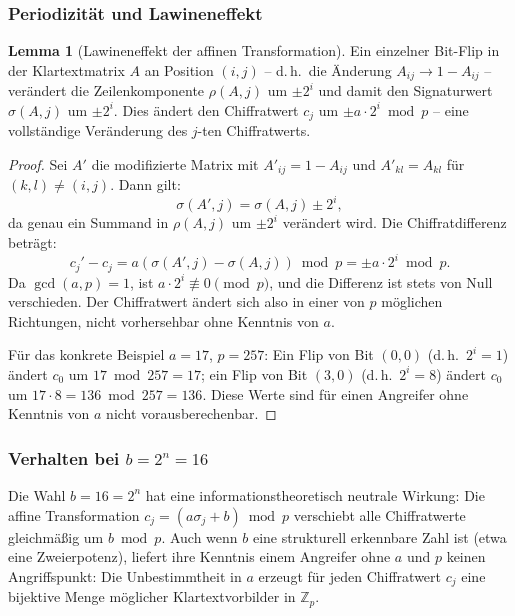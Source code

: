 ﻿\documentclass[a4paper,12pt]{scrreprt}
\theoremstyle{definition}
\newtheorem{lemma}{Lemma}[section]
\begin{document}
\subsubsection{Periodizität und Lawineneffekt}

\begin{lemma}[Lawineneffekt der affinen Transformation]
\label{lem:lawine}
Ein einzelner Bit-Flip in der Klartextmatrix $A$ an Position $(i, j)$ -- d.\,h.\ die Änderung $A_{ij} \to 1 - A_{ij}$ -- verändert die Zeilenkomponente $\rho(A,j)$ um $\pm 2^i$ und damit den Signaturwert $\sigma(A,j)$ um $\pm 2^i$. Dies ändert den Chiffratwert $c_j$ um $\pm a \cdot 2^i \bmod p$ -- eine vollständige Veränderung des $j$-ten Chiffratwerts.
\end{lemma}

\begin{proof}
Sei $A'$ die modifizierte Matrix mit $A'_{ij} = 1 - A_{ij}$ und $A'_{kl} = A_{kl}$ für $(k,l) \neq (i,j)$. Dann gilt:
\[
\sigma(A',j) = \sigma(A,j) \pm 2^i,
\]
da genau ein Summand in $\rho(A,j)$ um $\pm 2^i$ verändert wird. Die Chiffratdifferenz beträgt:
\[
c_j' - c_j = a(\sigma(A',j) - \sigma(A,j)) \bmod p = \pm a \cdot 2^i \bmod p.
\]
Da $\gcd(a,p)=1$, ist $a \cdot 2^i \not\equiv 0 \pmod p$, und die Differenz ist stets von Null verschieden. Der Chiffratwert ändert sich also in einer von $p$ möglichen Richtungen, nicht vorhersehbar ohne Kenntnis von $a$.

Für das konkrete Beispiel $a=17$, $p=257$: Ein Flip von Bit $(0,0)$ (d.\,h.\ $2^i = 1$) ändert $c_0$ um $17 \bmod 257 = 17$; ein Flip von Bit $(3,0)$ (d.\,h.\ $2^i = 8$) ändert $c_0$ um $17 \cdot 8 = 136 \bmod 257 = 136$. Diese Werte sind für einen Angreifer ohne Kenntnis von $a$ nicht vorausberechenbar.
\end{proof}

\subsubsection{Verhalten bei $b = 2^n = 16$}

Die Wahl $b = 16 = 2^n$ hat eine informationstheoretisch neutrale Wirkung: Die affine Transformation $c_j = (a\sigma_j + b) \bmod p$ verschiebt alle Chiffratwerte gleichmäßig um $b \bmod p$. Auch wenn $b$ eine strukturell erkennbare Zahl ist (etwa eine Zweierpotenz), liefert ihre Kenntnis einem Angreifer ohne $a$ und $p$ keinen Angriffspunkt: Die Unbestimmtheit in $a$ erzeugt für jeden Chiffratwert $c_j$ eine bijektive Menge möglicher Klartextvorbilder in $\mathbb{Z}_p$.
\end{document}
